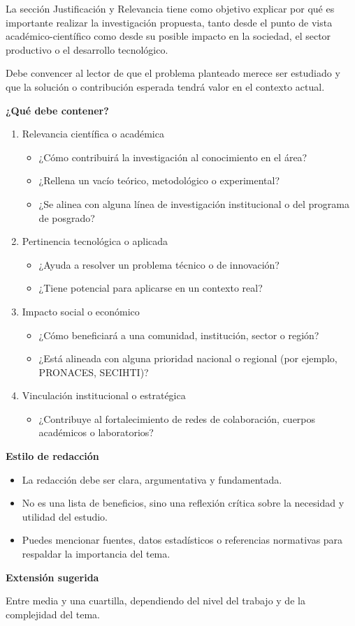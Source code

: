La sección Justificación y Relevancia tiene como objetivo explicar por qué es importante realizar la investigación propuesta, tanto desde el punto de vista académico-científico como desde su posible impacto en la sociedad, el sector productivo o el desarrollo tecnológico.

Debe convencer al lector de que el problema planteado merece ser estudiado y que la solución o contribución esperada tendrá valor en el contexto actual.

\textbf{¿Qué debe contener?}

\begin{enumerate}
    \item Relevancia científica o académica
    \begin{itemize}
        \item ¿Cómo contribuirá la investigación al conocimiento en el área?
        \item ¿Rellena un vacío teórico, metodológico o experimental?
        \item ¿Se alinea con alguna línea de investigación institucional o del programa de posgrado?
    \end{itemize}
    \item Pertinencia tecnológica o aplicada
    \begin{itemize}
        \item ¿Ayuda a resolver un problema técnico o de innovación?
        \item ¿Tiene potencial para aplicarse en un contexto real?
    \end{itemize}
    \item Impacto social o económico
    \begin{itemize}
        \item ¿Cómo beneficiará a una comunidad, institución, sector o región?
        \item ¿Está alineada con alguna prioridad nacional o regional (por ejemplo, PRONACES, SECIHTI)?
    \end{itemize}
    \item Vinculación institucional o estratégica
    \begin{itemize}
        \item ¿Contribuye al fortalecimiento de redes de colaboración, cuerpos académicos o laboratorios?
    \end{itemize}
\end{enumerate}

\textbf{Estilo de redacción}

\begin{itemize}
    \item La redacción debe ser clara, argumentativa y fundamentada.
    \item No es una lista de beneficios, sino una reflexión crítica sobre la necesidad y utilidad del estudio.
    \item Puedes mencionar fuentes, datos estadísticos o referencias normativas para respaldar la importancia del tema.
\end{itemize}

\textbf{Extensión sugerida}

Entre media y una cuartilla, dependiendo del nivel del trabajo y de la complejidad del tema.